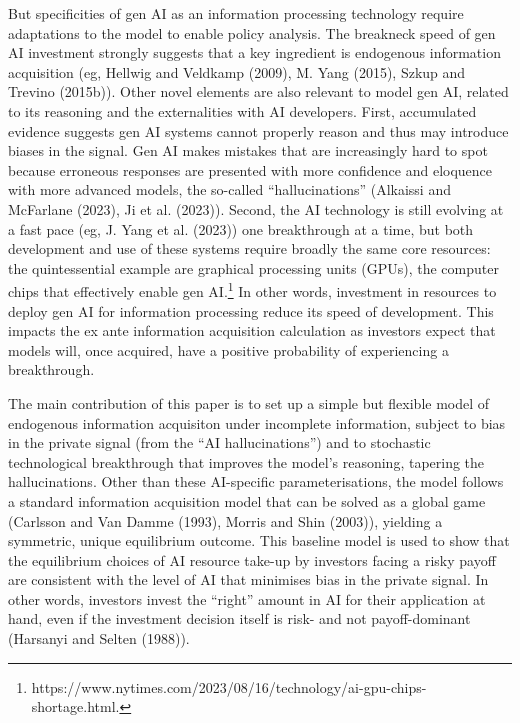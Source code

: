 \documentclass[
]{article}
\theoremstyle{plain}
\theoremstyle{definition}
\theoremstyle{remark}
\begin{document}
But specificities of gen AI as an information processing technology
require adaptations to the model to enable policy analysis. The
breakneck speed of gen AI investment strongly suggests that a key
ingredient is endogenous information acquisition (eg, Hellwig and
Veldkamp (2009), M. Yang (2015), Szkup and Trevino (2015b)). Other novel
elements are also relevant to model gen AI, related to its reasoning and
the externalities with AI developers. First, accumulated evidence
suggests gen AI systems cannot properly reason and thus may introduce
biases in the signal. Gen AI makes mistakes that are increasingly hard
to spot because erroneous responses are presented with more confidence
and eloquence with more advanced models, the so-called
``hallucinations'' (Alkaissi and McFarlane (2023), Ji et al. (2023)).
Second, the AI technology is still evolving at a fast pace (eg, J. Yang
et al. (2023)) one breakthrough at a time, but both development and use
of these systems require broadly the same core resources: the
quintessential example are graphical processing units (GPUs), the
computer chips that effectively enable gen AI.\footnote{https://www.nytimes.com/2023/08/16/technology/ai-gpu-chips-shortage.html.}
In other words, investment in resources to deploy gen AI for information
processing reduce its speed of development. This impacts the ex ante
information acquisition calculation as investors expect that models
will, once acquired, have a positive probability of experiencing a
breakthrough.

The main contribution of this paper is to set up a simple but flexible
model of endogenous information acquisiton under incomplete information,
subject to bias in the private signal (from the ``AI hallucinations'')
and to stochastic technological breakthrough that improves the model's
reasoning, tapering the hallucinations. Other than these AI-specific
parameterisations, the model follows a standard information acquisition
model that can be solved as a global game (Carlsson and Van Damme
(1993), Morris and Shin (2003)), yielding a symmetric, unique
equilibrium outcome. This baseline model is used to show that the
equilibrium choices of AI resource take-up by investors facing a risky
payoff are consistent with the level of AI that minimises bias in the
private signal. In other words, investors invest the ``right'' amount in
AI for their application at hand, even if the investment decision itself
is risk- and not payoff-dominant (Harsanyi and Selten (1988)).
\end{document}
